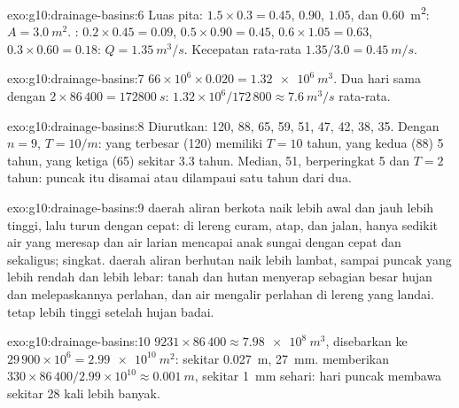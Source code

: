 \begin{solution}{exo:g10:drainage-basins:6}
Luas pita: $1.5 \times 0.3 = 0.45$, $0.90$, $1.05$, dan \qty{0.60}{m^2}:
$A = \qty{3.0}{m^2}$. : $0.2 \times 0.45 = 0.09$, $0.5 \times 0.90
= 0.45$, $0.6 \times 1.05 = 0.63$, $0.3 \times 0.60 = 0.18$: $Q =
\qty{1.35}{m^3/s}$. Kecepatan rata-rata $1.35/3.0 = \qty{0.45}{m/s}$.
\end{solution}

\begin{solution}{exo:g10:drainage-basins:7}
$66 \times 10^6 \times 0.020 = \qty{1.32e6}{m^3}$. Dua hari sama dengan
$2 \times 86\,400 = \qty{172800}{s}$: $1.32 \times 10^6/172\,800 \approx
\qty{7.6}{m^3/s}$ rata-rata.
\end{solution}

\begin{solution}{exo:g10:drainage-basins:8}
Diurutkan: 120, 88, 65, 59, 51, 47, 42, 38, 35. Dengan $n = 9$, $T = 10/m$:
yang terbesar (120) memiliki $T = 10$ tahun, yang kedua (88) 5 tahun, yang
ketiga (65) sekitar 3.3 tahun. Median, 51, berperingkat 5 dan $T = 2$ tahun:
puncak itu disamai atau dilampaui satu tahun dari dua.
\end{solution}

\begin{solution}{exo:g10:drainage-basins:9}
 daerah aliran berkota naik lebih awal dan jauh lebih tinggi, lalu
turun dengan cepat: di lereng curam, atap, dan jalan, hanya sedikit air yang
meresap dan air larian mencapai anak sungai dengan cepat dan sekaligus;  singkat.  daerah aliran berhutan naik lebih lambat, sampai
puncak yang lebih rendah dan lebih lebar: tanah dan hutan menyerap sebagian
besar hujan dan melepaskannya perlahan, dan air mengalir perlahan di lereng
yang landai.  tetap lebih tinggi setelah hujan badai.
\end{solution}

\begin{solution}{exo:g10:drainage-basins:10}
$9231 \times 86\,400 \approx \qty{7.98e8}{m^3}$, disebarkan ke
$29\,900 \times 10^6 = \qty{2.99e10}{m^2}$: sekitar \qty{0.027}{m},
\qty{27}{mm}.  memberikan $330 \times 86\,400/2.99 \times 10^{10}
\approx \qty{0.001}{m}$, sekitar \qty{1}{mm} sehari: hari puncak membawa
sekitar 28 kali lebih banyak.
\end{solution}

